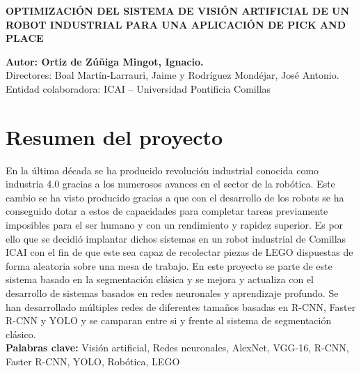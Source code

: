 {\setlength{\parindent}{0pt}
\begin{Large}
\textbf{OPTIMIZACIÓN DEL SISTEMA DE VISIÓN ARTIFICIAL DE UN ROBOT INDUSTRIAL PARA UNA APLICACIÓN DE PICK AND PLACE}
\end{Large}

\textbf{Autor: Ortiz de Zúñiga Mingot, Ignacio.} \\
Directores: Boal Martín-Larrauri, Jaime y Rodríguez Mondéjar, José Antonio. \\
Entidad colaboradora: ICAI – Universidad Pontificia Comillas \\

\section*{Resumen del proyecto}
En la última década se ha producido revolución industrial conocida como industria 4.0 gracias a los numerosos avances en el sector de la robótica. Este cambio se ha visto producido gracias a que con el desarrollo de los robots se ha conseguido dotar a estos de capacidades para completar tareas previamente imposibles para el ser humano y con un rendimiento y rapidez superior. Es por ello que se decidió implantar dichos sistemas en un robot industrial de Comillas ICAI con el fin de que este sea capaz de recolectar piezas de LEGO dispuestas de forma aleatoria sobre una mesa de trabajo. En este proyecto se parte de este sistema basado en la segmentación clásica y se mejora y actualiza con el desarrollo de sistemas basados en redes neuronales y aprendizaje profundo. Se han desarrollado múltiples redes de diferentes tamaños basadas en R-CNN, Faster R-CNN y YOLO y se camparan entre si y frente al sistema de segmentación clásico. \\
\textbf{Palabras clave:} Visión artificial, Redes neuronales, AlexNet, VGG-16, R-CNN, Faster R-CNN, YOLO, Robótica, LEGO

}

